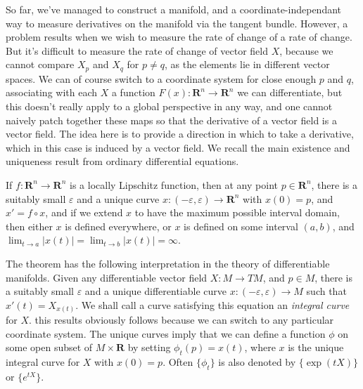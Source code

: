 So far, we've managed to construct a manifold, and a coordinate-independant way to measure derivatives on the manifold via the tangent bundle. However, a problem results when we wish to measure the rate of change of a rate of change. But it's difficult to measure the rate of change of vector field $X$, because we cannot compare $X_p$ and $X_q$ for $p \neq q$, as the elements lie in different vector spaces. We can of course switch to a coordinate system for close enough $p$ and $q$, associating with each $X$ a function $F(x) : \mathbf{R}^n \to \mathbf{R}^n$ we can differentiate, but this doesn't really apply to a global perspective in any way, and one cannot naively patch together these maps so that the derivative of a vector field is a vector field. The idea here is to provide a direction in which to take a derivative, which in this case is induced by a vector field. We recall the main existence and uniqueness result from ordinary differential equations.

\begin{theorem}
    If $f: \mathbf{R}^n \to \mathbf{R}^n$ is a locally Lipschitz function, then at any point $p \in \mathbf{R}^n$, there is a suitably small $\varepsilon$ and a unique curve $x: (-\varepsilon, \varepsilon) \to \mathbf{R}^n$ with $x(0) = p$, and $x' = f \circ x$, and if we extend $x$ to have the maximum possible interval domain, then either $x$ is defined everywhere, or $x$ is defined on some interval $(a,b)$, and $\lim_{t \to a} |x(t)| = \lim_{t \to b} |x(t)| = \infty$.
\end{theorem}

The theorem has the following interpretation in the theory of differentiable manifolds. Given any differentiable vector field $X: M \to TM$, and $p \in M$, there is a suitably small $\varepsilon$ and a unique differentiable curve $x: (-\varepsilon,\varepsilon) \to M$ such that $x'(t) = X_{x(t)}$. We shall call a curve satisfying this equation an \emph{integral curve} for $X$. this results obviously follows because we can switch to any particular coordinate system. The unique curves imply that we can define a function $\phi$ on some open subset of $M \times \mathbf{R}$ by setting $\phi_t(p) = x(t)$, where $x$ is the unique integral curve for $X$ with $x(0) = p$. Often $\{ \phi_t \}$ is also denoted by $\{ \exp(tX) \}$ or $\{ e^{tX} \}$. 


